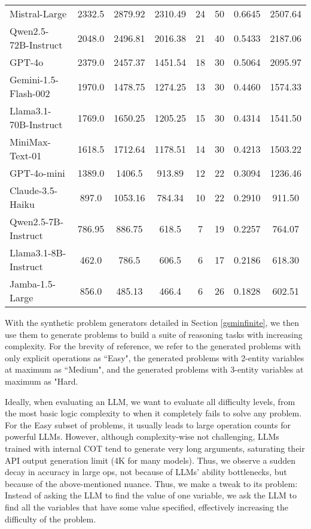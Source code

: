 \begin{table*}[ht]
\begin{tabular}{@{}lccc|ccc|c@{}}
Mistral-Large & 2332.5 & 2879.92 & 2310.49 & 24 & 50 & 0.6645 & 2507.64 \\
Qwen2.5-72B-Instruct & 2048.0 & 2496.81 & 2016.38 & 21 & 40 & 0.5433 & 2187.06 \\
GPT-4o & 2379.0 & 2457.37 & 1451.54 & 18 & 30 & 0.5064 & 2095.97 \\
Gemini-1.5-Flash-002 & 1970.0 & 1478.75 & 1274.25 & 13 & 30 & 0.4460 & 1574.33 \\
Llama3.1-70B-Instruct & 1769.0 & 1650.25 & 1205.25 & 15 & 30 & 0.4314 & 1541.50 \\
\rowcolor{palegreen!20} 
MiniMax-Text-01 & 1618.5 & 1712.64 & 1178.51 & 14 & 30 & 0.4213 & 1503.22 \\
GPT-4o-mini & 1389.0 & 1406.5 & 913.89 & 12 & 22 & 0.3094 & 1236.46 \\
Claude-3.5-Haiku & 897.0 & 1053.16 & 784.34 & 10 & 22 & 0.2910 & 911.50 \\
Qwen2.5-7B-Instruct & 786.95 & 886.75 & 618.5 & 7 & 19 & 0.2257 & 764.07 \\
Llama3.1-8B-Instruct & 462.0 & 786.5 & 606.5 & 6 & 17 & 0.2186 & 618.30 \\
\rowcolor{skyblue!20} 
Jamba-1.5-Large & 856.0 & 485.13 & 466.4 & 6 & 26 & 0.1828 & 602.51 \\
\bottomrule
\end{tabular} 
\label{zerocontextleaderb} 
\end{table*} 

With the synthetic problem generators detailed in Section \ref{gsminfinite}, we then use them to generate problems to build a suite of reasoning tasks with increasing complexity. For the brevity of reference, we refer to the generated problems with only explicit operations as ``Easy", the generated problems with 2-entity variables at maximum as ``Medium", and the generated problems with 3-entity variables at maximum as "Hard. 

Ideally, when evaluating an LLM, we want to evaluate all difficulty levels, from the most basic logic complexity to when it completely fails to solve any problem. For the Easy subset of problems, it usually leads to large operation counts for powerful LLMs. 
However, although complexity-wise not challenging, LLMs trained with internal COT tend to generate very long arguments, saturating their API output generation limit (4K for many models). Thus, we observe a sudden decay in accuracy in large ops, not because of LLMs' ability bottlenecks, but because of the above-mentioned nuance. Thus, we make a tweak to its problem: Instead of asking the LLM to find the value of one variable, we ask the LLM to find all the variables that have some value specified, effectively increasing the difficulty of the problem. 

